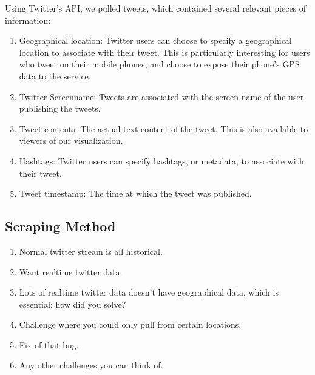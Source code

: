 \documentclass[pdftex,12pt,a4paper]{article}
\begin{document}
Using Twitter's API, we pulled tweets, which contained several relevant pieces of information:
\begin{enumerate}
\item Geographical location: Twitter users can choose to specify a geographical location to associate with their tweet. This is particularly interesting for users who tweet on their mobile phones, and choose to expose their phone's GPS data to the service.
\item Twitter Screenname: Tweets are associated with the screen name of the user publishing the tweets.
\item Tweet contents: The actual text content of the tweet. This is also available to viewers of our visualization.
\item Hashtags: Twitter users can specify hashtags, or metadata, to associate with their tweet. 
\item Tweet timestamp: The time at which the tweet was published.
\end{enumerate}

\subsection{Scraping Method}
\begin{enumerate}
\item Normal twitter stream is all historical.
\item Want realtime twitter data.
\item Lots of realtime twitter data doesn't have geographical data, which is essential; how did you solve?
\item Challenge where you could only pull from certain locations.
\item Fix of that bug.
\item Any other challenges you can think of.
\end{enumerate}
\end{document}
